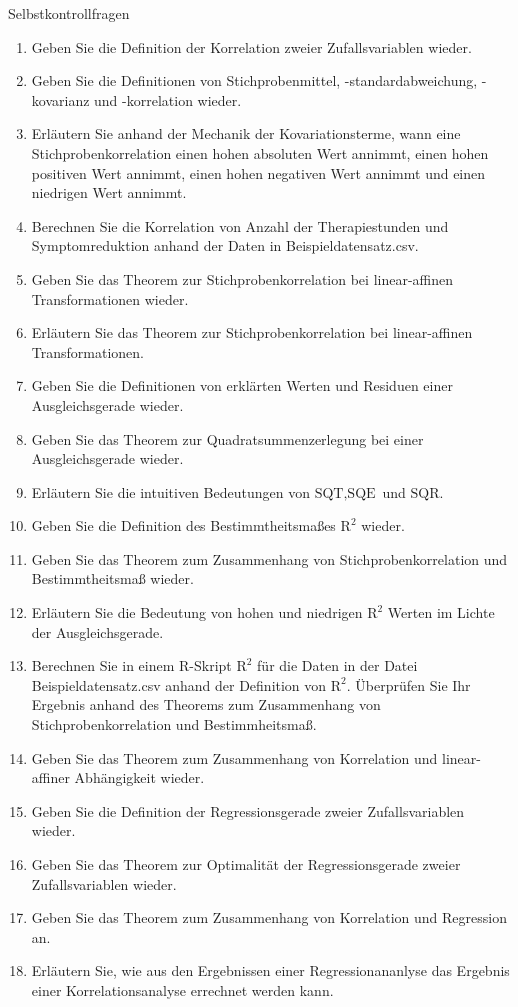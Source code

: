 \documentclass[
  8pt,
  ignorenonframetext,
]{beamer}
\providecommand{\tightlist}{%
  \setlength{\itemsep}{0pt}\setlength{\parskip}{0pt}}
\begin{document}
\begin{frame}{Selbstkontrollfragen}
\protect\hypertarget{selbstkontrollfragen}{}
\tiny
\justifying

\begin{enumerate}
\tightlist
\item
  Geben Sie die Definition der Korrelation zweier Zufallsvariablen
  wieder.
\item
  Geben Sie die Definitionen von Stichprobenmittel, -standardabweichung,
  -kovarianz und -korrelation wieder.
\item
  Erläutern Sie anhand der Mechanik der Kovariationsterme, wann eine
  Stichprobenkorrelation einen hohen absoluten Wert annimmt, einen hohen
  positiven Wert annimmt, einen hohen negativen Wert annimmt und einen
  niedrigen Wert annimmt.
\item
  Berechnen Sie die Korrelation von Anzahl der Therapiestunden und
  Symptomreduktion anhand der Daten in Beispieldatensatz.csv.
\item
  Geben Sie das Theorem zur Stichprobenkorrelation bei linear-affinen
  Transformationen wieder.
\item
  Erläutern Sie das Theorem zur Stichprobenkorrelation bei
  linear-affinen Transformationen.
\item
  Geben Sie die Definitionen von erklärten Werten und Residuen einer
  Ausgleichsgerade wieder.
\item
  Geben Sie das Theorem zur Quadratsummenzerlegung bei einer
  Ausgleichsgerade wieder.
\item
  Erläutern Sie die intuitiven Bedeutungen von
  \(\mbox{SQT}, \mbox{SQE}\) und \(\mbox{SQR}\).
\item
  Geben Sie die Definition des Bestimmtheitsmaßes \(\mbox{R}^2\) wieder.
\item
  Geben Sie das Theorem zum Zusammenhang von Stichprobenkorrelation und
  Bestimmtheitsmaß wieder.
\item
  Erläutern Sie die Bedeutung von hohen und niedrigen \(\mbox{R}^2\)
  Werten im Lichte der Ausgleichsgerade.
\item
  Berechnen Sie in einem R-Skript \(\mbox{R}^2\) für die Daten in der
  Datei Beispieldatensatz.csv anhand der Definition von \(\mbox{R}^2\).
  Überprüfen Sie Ihr Ergebnis anhand des Theorems zum Zusammenhang von
  Stichprobenkorrelation und Bestimmheitsmaß.
\item
  Geben Sie das Theorem zum Zusammenhang von Korrelation und
  linear-affiner Abhängigkeit wieder.
\item
  Geben Sie die Definition der Regressionsgerade zweier Zufallsvariablen
  wieder.
\item
  Geben Sie das Theorem zur Optimalität der Regressionsgerade zweier
  Zufallsvariablen wieder.
\item
  Geben Sie das Theorem zum Zusammenhang von Korrelation und Regression
  an.
\item
  Erläutern Sie, wie aus den Ergebnissen einer Regressionananlyse das
  Ergebnis einer Korrelationsanalyse errechnet werden kann.
\end{enumerate}
\end{frame}
\end{document}
